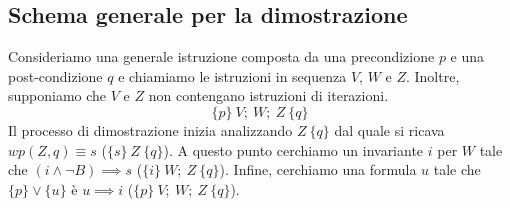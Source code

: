\subsection{Schema generale per la dimostrazione}
Consideriamo una generale istruzione composta da una precondizione $p$ e una
post-condizione $q$ e chiamiamo le istruzioni in sequenza $V$, $W$ e $Z$.
Inoltre, supponiamo che $V$ e $Z$ non contengano istruzioni di iterazioni.
\begin{equation}
    \{p\} \ V; \ W; \ Z \ \{q\}
\end{equation}
Il processo di dimostrazione inizia analizzando $Z \ \{q\}$ dal quale si ricava
$wp(Z, q) \equiv s$ ($\{s\} \ Z \ \{q\}$). A questo punto cerchiamo un invariante
$i$ per $W$ tale che $(i \land \lnot B) \implies s$ ($\{i\} \ W; \ Z \ \{q\}$).
Infine, cerchiamo una formula $u$ tale che $\{p\} \lor \{u\}$ è $u \implies i$
($\{p\} \ V; \ W; \ Z \ \{q\}$).
